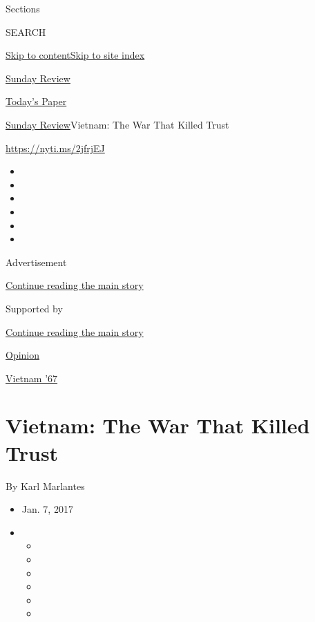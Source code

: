 Sections

SEARCH

\protect\hyperlink{site-content}{Skip to
content}\protect\hyperlink{site-index}{Skip to site index}

\href{https://www.nytimes3xbfgragh.onion/section/opinion/sunday}{Sunday
Review}

\href{https://myaccount.nytimes3xbfgragh.onion/auth/login?response_type=cookie\&client_id=vi}{}

\href{https://www.nytimes3xbfgragh.onion/section/todayspaper}{Today's
Paper}

\href{/section/opinion/sunday}{Sunday Review}\textbar{}Vietnam: The War
That Killed Trust

\url{https://nyti.ms/2jfrjEJ}

\begin{itemize}
\item
\item
\item
\item
\item
\item
\end{itemize}

Advertisement

\protect\hyperlink{after-top}{Continue reading the main story}

Supported by

\protect\hyperlink{after-sponsor}{Continue reading the main story}

\href{/section/opinion}{Opinion}

\href{/column/vietnam-67}{Vietnam '67}

\hypertarget{vietnam-the-war-that-killed-trust}{%
\section{Vietnam: The War That Killed
Trust}\label{vietnam-the-war-that-killed-trust}}

By Karl Marlantes

\begin{itemize}
\item
  Jan. 7, 2017
\item
  \begin{itemize}
  \item
  \item
  \item
  \item
  \item
  \item
  \end{itemize}
\end{itemize}

